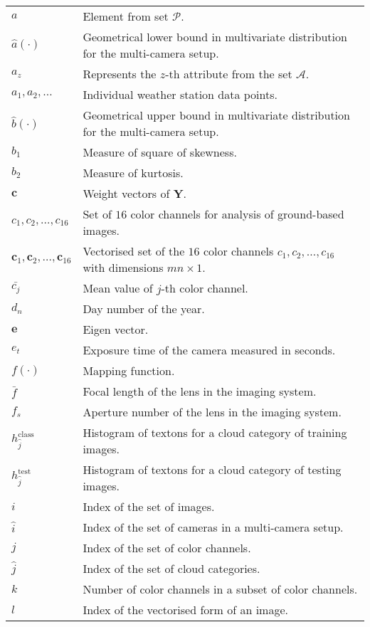 \begin{longtable}[l]{p{80pt}p{320pt}}
$a$ & Element from set $\mathcal{P}$.\\
$\hat{a}(\cdot)$ & Geometrical lower bound in multivariate distribution for the multi-camera setup.\\
$a_z$ & Represents the $z$-th attribute from the set $\mathcal{A}$.\\
$a_1, a_2,\ldots$ & Individual weather station data points. \\
$\hat{b}(\cdot)$ & Geometrical upper bound in multivariate distribution for the multi-camera setup.\\
$b_{1}$ & Measure of square of skewness.\\
$b_{2}$ & Measure of kurtosis. \\
$\mathbf{c}$ & Weight vectors of $\mathbf{Y}$. \\
$c_1, c_2,\ldots,c_{16}$ & Set of $16$ color channels for analysis of ground-based images.\\
$\textbf{c}_{1}, \textbf{c}_{2}, \ldots, \textbf{c}_{16}$ & Vectorised set of the $16$ color channels $c_1, c_2,\ldots,c_{16}$ with dimensions $mn \times 1$.\\
$\bar{c_{j}}$ & Mean value of $j$-th color channel. \\
$d_n$ & Day number of the year. \\
$\mathbf{e}$ & Eigen vector. \\
$e_t$ & Exposure time of the camera measured in seconds. \\
$f(\cdot)$ & Mapping function. \\
$\bar{f}$ & Focal length of the lens in the imaging system.\\
$f_s$ & Aperture number of the lens in the imaging system.\\
$h_{\hat{j}}^{\mbox{class}}$ & Histogram of textons for a cloud category of training images. \\
$h_{\hat{j}}^{\mbox{test}}$ & Histogram of textons for a cloud category of testing images. \\
$i$ & Index of the set of images. \\
$\hat{i}$ & Index of the set of cameras in a multi-camera setup. \\
$j$ & Index of the set of color channels. \\
$\hat{j}$ & Index of the set of cloud categories. \\
$k$ & Number of color channels in a subset of color channels. \\
$l$ & Index of the vectorised form of an image.\\

\end{longtable}
